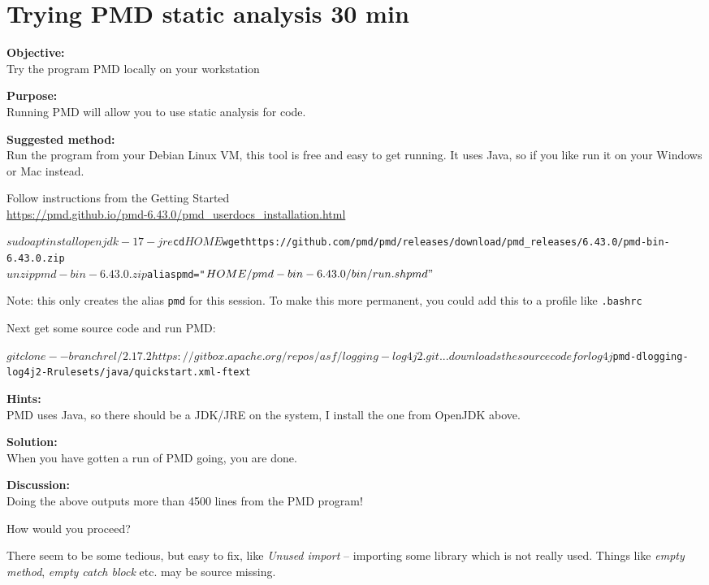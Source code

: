 \documentclass[a4paper,11pt,notitlepage]{report}
\begin{document}
\chapter{Trying PMD static analysis 30 min}
\label{ex:pmd-static}

{\bf Objective:}\\
Try the program PMD locally on your workstation


{\bf Purpose:}\\
Running PMD will allow you to use static analysis for code.

{\bf Suggested method:}\\
Run the program from your Debian Linux VM, this tool is free and easy to get running. It uses Java, so if you like run it on your Windows or Mac instead.

Follow instructions from the Getting Started\\
\url{https://pmd.github.io/pmd-6.43.0/pmd_userdocs_installation.html}

\begin{alltt}\footnotesize
$ sudo apt install openjdk-17-jre
$ cd $HOME
$ wget https://github.com/pmd/pmd/releases/download/pmd_releases/6.43.0/pmd-bin-6.43.0.zip
$ unzip pmd-bin-6.43.0.zip
$ alias pmd="$HOME/pmd-bin-6.43.0/bin/run.sh pmd"
$
\end{alltt}

Note: this only creates the alias \verb+pmd+ for this session. To make this more permanent, you could add this to a profile like \verb+.bashrc+

Next get some source code and run PMD:
\begin{alltt}\footnotesize
$ git clone --branch rel/2.17.2 https://gitbox.apache.org/repos/asf/logging-log4j2.git
... downloads the source code for log4j
$ pmd -d logging-log4j2 -R rulesets/java/quickstart.xml -f text
\end{alltt}


{\bf Hints:}\\
PMD uses Java, so there should be a JDK/JRE on the system, I install the one from OpenJDK above.

{\bf Solution:}\\
When you have gotten a run of PMD going, you are done.

{\bf Discussion:}\\
Doing the above outputs more than 4500 lines from the PMD program!

How would you proceed?

There seem to be some tedious, but easy to fix, like \emph{Unused import} -- importing some library which is not really used. Things like \emph{empty method}, \emph{empty catch block} etc. may be source missing.
\end{document}
